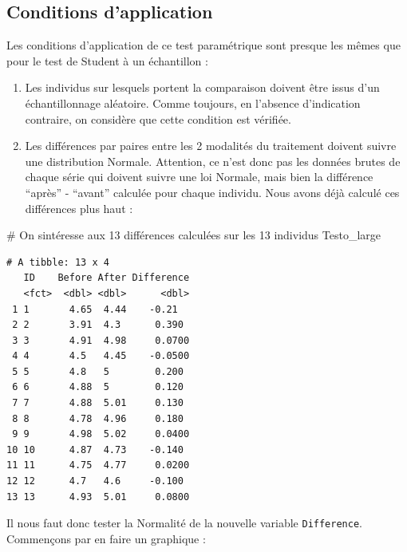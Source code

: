 \documentclass[
  french,
  a4paper,
  DIV=11,
  numbers=noendperiod,
  oneside]{scrreprt}
\newenvironment{Shaded}{}{}
\newcommand{\CommentTok}[1]{\textcolor[rgb]{0.42,0.45,0.49}{#1}}
\newcommand{\NormalTok}[1]{\textcolor[rgb]{0.14,0.16,0.18}{#1}}
\providecommand{\tightlist}{%
  \setlength{\itemsep}{0pt}\setlength{\parskip}{0pt}}
\begin{document}
\subsection{Conditions d'application}\label{conditions-dapplication}

Les conditions d'application de ce test paramétrique sont presque les
mêmes que pour le test de Student à un échantillon :

\begin{enumerate}
\def\labelenumi{\arabic{enumi}.}
\tightlist
\item
  Les individus sur lesquels portent la comparaison doivent être issus
  d'un échantillonnage aléatoire. Comme toujours, en l'absence
  d'indication contraire, on considère que cette condition est vérifiée.
\item
  Les différences par paires entre les 2 modalités du traitement doivent
  suivre une distribution Normale. Attention, ce n'est donc pas les
  données brutes de chaque série qui doivent suivre une loi Normale,
  mais bien la différence ``après'' - ``avant'' calculée pour chaque
  individu. Nous avons déjà calculé ces différences plus haut :
\end{enumerate}

\begin{Shaded}
\begin{Highlighting}[]
\CommentTok{\# On s\textquotesingle{}intéresse aux 13 différences calculées sur les 13 individus}
\NormalTok{Testo\_large }
\end{Highlighting}
\end{Shaded}

\begin{verbatim}
# A tibble: 13 x 4
   ID    Before After Difference
   <fct>  <dbl> <dbl>      <dbl>
 1 1       4.65  4.44    -0.21  
 2 2       3.91  4.3      0.390 
 3 3       4.91  4.98     0.0700
 4 4       4.5   4.45    -0.0500
 5 5       4.8   5        0.200 
 6 6       4.88  5        0.120 
 7 7       4.88  5.01     0.130 
 8 8       4.78  4.96     0.180 
 9 9       4.98  5.02     0.0400
10 10      4.87  4.73    -0.140 
11 11      4.75  4.77     0.0200
12 12      4.7   4.6     -0.100 
13 13      4.93  5.01     0.0800
\end{verbatim}

Il nous faut donc tester la Normalité de la nouvelle variable
\texttt{Difference}. Commençons par en faire un graphique :
\end{document}

